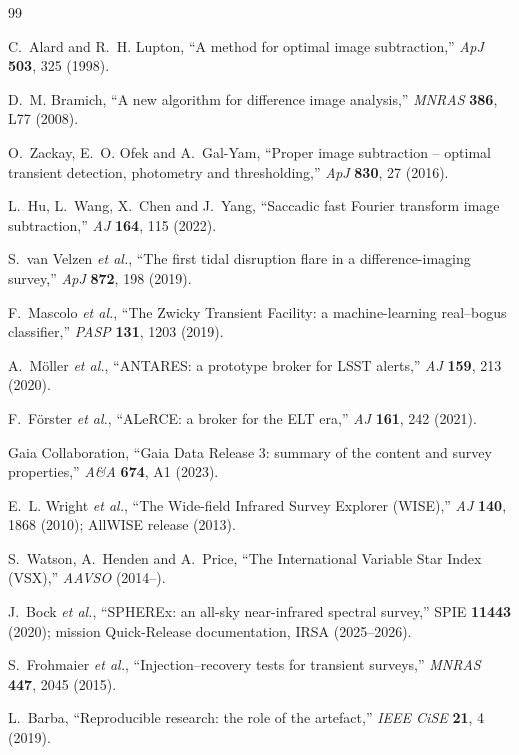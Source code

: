 \documentclass[11pt,a4paper]{article}
\begin{document}
\begin{thebibliography}{99}
\small

 C.~Alard and R.~H. Lupton, ``A method for optimal image subtraction,''
  \emph{ApJ} \textbf{503}, 325 (1998).

 D.~M. Bramich, ``A new algorithm for difference image analysis,''
  \emph{MNRAS} \textbf{386}, L77 (2008).

 O.~Zackay, E.~O. Ofek and A.~Gal-Yam, ``Proper image subtraction -- optimal
  transient detection, photometry and thresholding,'' \emph{ApJ} \textbf{830}, 27 (2016).

 L.~Hu, L.~Wang, X.~Chen and J.~Yang, ``Saccadic fast Fourier transform image
  subtraction,'' \emph{AJ} \textbf{164}, 115 (2022).

 S.~van Velzen \emph{et al.}, ``The first tidal disruption flare in a
  difference-imaging survey,'' \emph{ApJ} \textbf{872}, 198 (2019).

 F.~Mascolo \emph{et al.}, ``The Zwicky Transient Facility: a machine-learning
  real--bogus classifier,'' \emph{PASP} \textbf{131}, 1203 (2019).

 A.~M\"oller \emph{et al.}, ``ANTARES: a prototype broker for LSST alerts,''
  \emph{AJ} \textbf{159}, 213 (2020).

 F.~F\"orster \emph{et al.}, ``ALeRCE: a broker for the ELT era,''
  \emph{AJ} \textbf{161}, 242 (2021).

 Gaia Collaboration, ``Gaia Data Release 3: summary of the content and survey
  properties,'' \emph{A\&A} \textbf{674}, A1 (2023).

 E.~L. Wright \emph{et al.}, ``The Wide-field Infrared Survey Explorer (WISE),''
  \emph{AJ} \textbf{140}, 1868 (2010); AllWISE release (2013).

 S.~Watson, A.~Henden and A.~Price, ``The International Variable Star Index (VSX),''
  \emph{AAVSO} (2014--).

 J.~Bock \emph{et al.}, ``SPHEREx: an all-sky near-infrared spectral survey,''
  SPIE \textbf{11443} (2020); mission Quick-Release documentation, IRSA (2025--2026).

 S.~Frohmaier \emph{et al.}, ``Injection--recovery tests for transient
  surveys,'' \emph{MNRAS} \textbf{447}, 2045 (2015).

 L.~Barba, ``Reproducible research: the role of the artefact,''
  \emph{IEEE CiSE} \textbf{21}, 4 (2019).

\end{thebibliography}
\end{document}
